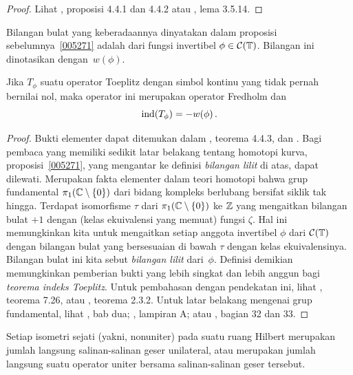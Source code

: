 \begin{proof} Lihat \cite{Arveson:2002}, proposisi 4.4.1 dan 4.4.2 atau \cite{Murphy:1990},
lema 3.5.14. \ns
\end{proof}

\begin{defn} Bilangan bulat yang keberadaannya dinyatakan dalam proposisi sebelumnya~\ref{005271}
adalah
 dari fungsi invertibel $\phi \in \mathcal{C}(\mathbb{T})$. Bilangan ini dinotasikan
dengan~$w(\phi)$.
\end{defn}

\begin{thm}\label{005274}
Jika $T_\phi$ suatu operator Toeplitz dengan simbol kontinu yang tidak pernah bernilai nol, maka operator ini
merupakan operator Fredholm dan
   \[ \operatorname{ind}(T_\phi) = -w(\phi)\,. \]
\end{thm}

\begin{proof} Bukti elementer dapat ditemukan dalam \cite{Arveson:2002}, teorema 4.4.3, dan
\cite{Murphy:1990}. Bagi pembaca yang memiliki sedikit latar belakang tentang homotopi kurva,
proposisi~\ref{005271}, yang mengantar ke definisi \emph{bilangan lilit} di atas,
dapat dilewati. Merupakan fakta elementer dalam teori homotopi bahwa grup fundamental
$\pi_1(\mathbb{C} \setminus \{0\})$ dari bidang kompleks berlubang bersifat siklik tak hingga. Terdapat
isomorfisme $\tau$ dari $\pi_1(\mathbb{C} \setminus \{0\})$ ke $\mathbb{Z}$ yang mengaitkan bilangan bulat $+1$
dengan (kelas ekuivalensi yang memuat) fungsi $\zeta$. Hal ini memungkinkan kita untuk
mengaitkan setiap anggota invertibel $\phi$ dari $\mathcal{C}(\mathbb{T})$ dengan bilangan bulat yang bersesuaian
di bawah $\tau$ dengan kelas ekuivalensinya. Bilangan bulat ini kita sebut
\emph{bilangan lilit} dari~$\phi$. Definisi demikian memungkinkan pemberian bukti yang lebih singkat
dan lebih anggun bagi \emph{teorema indeks Toeplitz}. Untuk pembahasan dengan pendekatan ini,
lihat \cite{Douglas:1972}, teorema 7.26, atau \cite{HigsonR:2000}, teorema 2.3.2. Untuk
latar belakang mengenai grup fundamental, lihat \cite{Massey:1967}, bab dua;
\cite{Wallace:1970}, lampiran A; atau \cite{Willard:1968}, bagian 32 dan 33. \ns
\end{proof}

\begin{thm}
Setiap
isometri sejati (yakni, nonuniter) pada suatu ruang Hilbert merupakan jumlah langsung salinan-salinan
geser unilateral, atau merupakan jumlah langsung suatu operator uniter bersama salinan-salinan
geser tersebut.
\end{thm}


